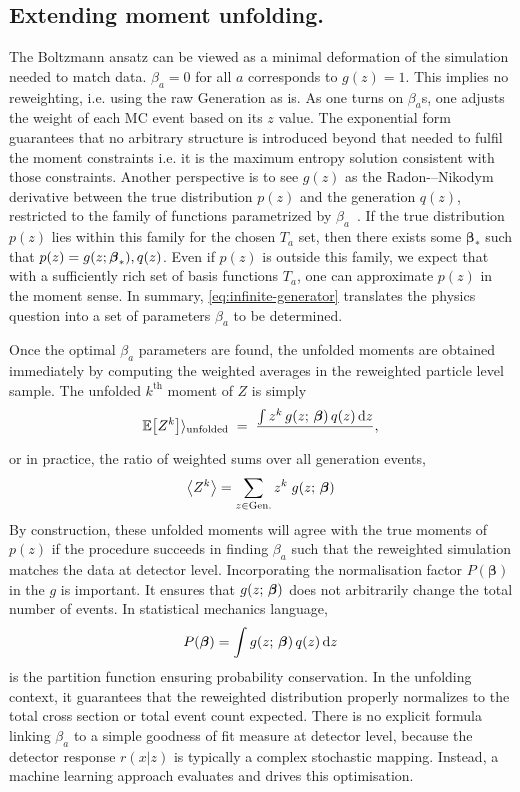 {{    \subsection{Extending moment unfolding.}
        The Boltzmann ansatz can be viewed as a minimal deformation of the simulation needed to match data.
        $\beta_a = 0$ for all $a$ corresponds to $g(z)=1$.
        This implies no reweighting, i.e. using the raw Generation as is.
         As one turns on $\beta_a$s, one adjusts the weight of each MC event based on its $z$ value.
        The exponential form guarantees that no arbitrary structure is introduced beyond that needed to fulfil the moment constraints i.e. it is the maximum entropy solution consistent with those constraints.
        Another perspective is to see $g(z)$ as the Radon-–Nikodym derivative between the true distribution $p(z)$ and the generation $q(z)$, restricted to the family of functions parametrized by $\beta_a$~\cite{NikodymSurRadon, radon_theorie_1913}.
        If the true distribution $p(z)$ lies within this family for the chosen $T_a$ set, then there exists some $\boldsymbol{\beta}_*$ such that $p(z) = g(z; \vb*{\beta}_*),q(z)$.
        Even if $p(z)$ is outside this family, we expect that with a sufficiently rich set of basis functions $T_a$, one can approximate $p(z)$ in the moment sense.
        In summary, \cref{eq:infinite-generator} translates the physics question into a set of parameters $\beta_a$ to be determined.

        Once the optimal $\beta_a$ parameters are found, the unfolded moments are obtained immediately by computing the weighted averages in the reweighted particle level sample.
        The unfolded $k^\text{th}$ moment of $Z$ is simply
        \[
            \mathbb{E}\qty[Z^k] \rangle_{\text{unfolded}} \;=\; \frac{\int z^k\,g(z;\,\vb*\beta)\,q(z)\,\dd z} ~,
        \]
        or in practice, the ratio of weighted sums over all generation events,
        \[
            \ev{Z^k} = \sum_{z\in \text{Gen.}} z^k\;g(z;\, \vb*\beta)
        \]
        By construction, these unfolded moments will agree with the true moments of $p(z)$ if the procedure succeeds in finding $\beta_a$ such that the reweighted simulation matches the data at detector level.
        Incorporating the normalisation factor $P(\boldsymbol{\beta})$ in the \(g\) is important.
        It ensures that $g(z;\,\vb*\beta)$ does not arbitrarily change the total number of events.
        In statistical mechanics language,
        \[
            P(\boldsymbol{\beta})  = \int g(z;\,\vb*\beta)\,q(z)\,\dd z
        \]
        is the partition function ensuring probability conservation.
        In the unfolding context, it guarantees that the reweighted distribution properly normalizes to the total cross section or total event count expected.
        There is no explicit formula linking $\beta_a$ to a simple goodness of fit measure at detector level, because the detector response $r(x|z)$ is typically a complex stochastic mapping.
        Instead, a machine learning approach evaluates and drives this optimisation.
        
}}
